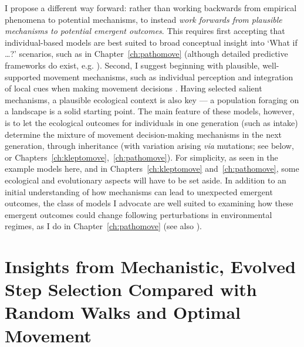 I propose a different way forward: rather than working backwards from empirical phenomena to potential mechanisms, to instead \textit{work forwards from plausible mechanisms to potential emergent outcomes}.
This requires first accepting that individual-based models are best suited to broad conceptual insight into `What if \ldots?' scenarios, such as in Chapter~\ref{ch:pathomove} (although detailed predictive frameworks do exist, e.g. \cite{bocedi2014}).
Second, I suggest beginning with plausible, well-supported movement mechanisms, such as individual perception and integration of local cues when making movement decisions \parencite{nathan2008a}.
Having selected salient mechanisms, a plausible ecological context is also key --- a population foraging on a landscape is a solid starting point.
The main feature of these models, however, is to let the ecological outcomes for individuals in one generation (such as intake) determine the mixture of movement decision-making mechanisms in the next generation, through inheritance (with variation arising \textit{via} mutations; see below, or Chapters~\ref{ch:kleptomove},~\ref{ch:pathomove}).
For simplicity, as seen in the example models here, and in Chapters~\ref{ch:kleptomove} and~\ref{ch:pathomove}, some ecological and evolutionary aspects will have to be set aside.
In addition to an initial understanding of how mechanisms can lead to unexpected emergent outcomes, the class of models I advocate are well suited to examining how these emergent outcomes could change following perturbations in environmental regimes, as I do in Chapter~\ref{ch:pathomove} (see also \cite{botero2015}).

\section*{Insights from Mechanistic, Evolved Step Selection Compared with Random Walks and Optimal Movement}


